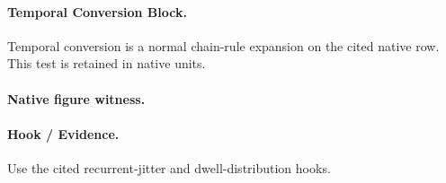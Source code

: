 \paragraph{Temporal Conversion Block.} Temporal conversion is a normal chain-rule expansion on the cited native row. This test is retained in native units.
\paragraph{Native figure witness.}
\begin{center}
\end{center}
\paragraph{Hook / Evidence.} Use the cited recurrent-jitter and dwell-distribution hooks.

